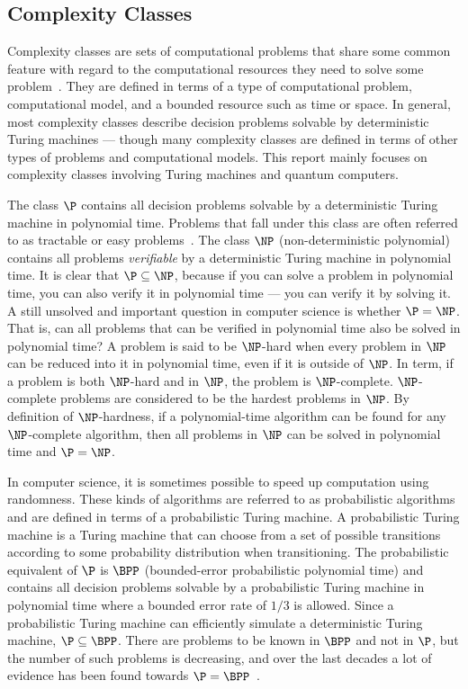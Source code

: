 \subsection{Complexity Classes}
Complexity classes are sets of computational problems that share some common feature with regard to the computational resources they need to solve some problem~\cite{arora2009computational}.
They are defined in terms of a type of computational problem, computational model, and a bounded resource such as time or space.
In general, most complexity classes describe decision problems solvable by deterministic Turing machines --- though many complexity classes are defined in terms of other types of problems and computational models.
This report mainly focuses on complexity classes involving Turing machines and quantum computers.

The class $\P$ contains all decision problems solvable by a deterministic Turing machine in polynomial time.
Problems that fall under this class are often referred to as tractable or easy problems~\cite{cormen2009introduction}.
The class $\NP$ (non-deterministic polynomial) contains all problems \emph{verifiable} by a deterministic Turing machine in polynomial time.
It is clear that $\P \subseteq \NP$, because if you can solve a problem in polynomial time, you can also verify it in polynomial time --- you can verify it by solving it.
A still unsolved and important question in computer science is whether $\P = \NP$.
That is, can all problems that can be verified in polynomial time also be solved in polynomial time?
A problem is said to be $\NP$-hard when every problem in $\NP$ can be reduced into it in polynomial time, even if it is outside of $\NP$.
In term, if a problem is both $\NP$-hard and in $\NP$, the problem is $\NP$-complete.
$\NP$-complete problems are considered to be the hardest problems in $\NP$.
By definition of $\NP$-hardness, if a polynomial-time algorithm can be found for any $\NP$-complete algorithm, then all problems in $\NP$ can be solved in polynomial time and $\P = \NP$.

In computer science, it is sometimes possible to speed up computation using randomness.
These kinds of algorithms are referred to as probabilistic algorithms and are defined in terms of a probabilistic Turing machine.
A probabilistic Turing machine is a Turing machine that can choose from a set of possible transitions according to some probability distribution when transitioning.
The probabilistic equivalent of $\P$ is $\BPP$ (bounded-error probabilistic polynomial time) and contains all decision problems solvable by a probabilistic Turing machine in polynomial time where a bounded error rate of $1/3$ is allowed.
Since a probabilistic Turing machine can efficiently simulate a deterministic Turing machine, $\P \subseteq \BPP$.
There are problems to be known in $\BPP$ and not in $\P$, but the number of such problems is decreasing, and over the last decades a lot of evidence has been found towards $\P = \BPP$~\cite{aaronson2013quantum, goldreich2011world, nisan1994hardness}.

